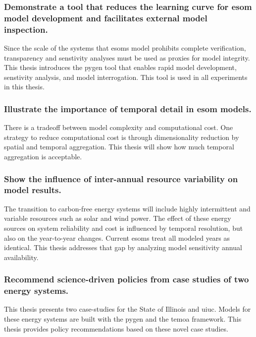 \subsubsection{Demonstrate a tool that reduces the learning curve for \gls{esom}
model development and facilitates external model inspection.} Since the scale
of the systems that \glspl{esom} model prohibits complete verification, transparency
and senstivity analyses must be used as proxies for model integrity. This thesis
introduces the \gls{pygen} tool that enables rapid model development, senstivity
analysis, and model interrogation. This tool is used in all experiments in this
thesis.

\subsubsection{Illustrate the importance of temporal detail in \gls{esom} models.}
There is a tradeoff between model complexity and computational cost. One strategy
to reduce computational cost is through dimensionality reduction by spatial
and temporal aggregation. This thesis will show how much temporal aggregation is
acceptable.

\subsubsection{Show the influence of inter-annual resource variability on model
results.} The transition to carbon-free energy systems will include highly intermittent
and variable resources such as solar and wind power. The effect of these energy
sources on system reliability and cost is influenced by temporal resolution, but
also on the year-to-year changes. Current \glspl{esom} treat all modeled years
as identical. This thesis addresses that gap by analyzing model sensitivity annual
availability.

\subsubsection{Recommend science-driven policies from case studies of two energy systems.}
This thesis presents two case-studies for the State of Illinois and \gls{uiuc}.
Models for these energy systems are built with the \gls{pygen} and the \gls{temoa}
framework. This thesis provides policy recommendations based on these novel case
studies.

